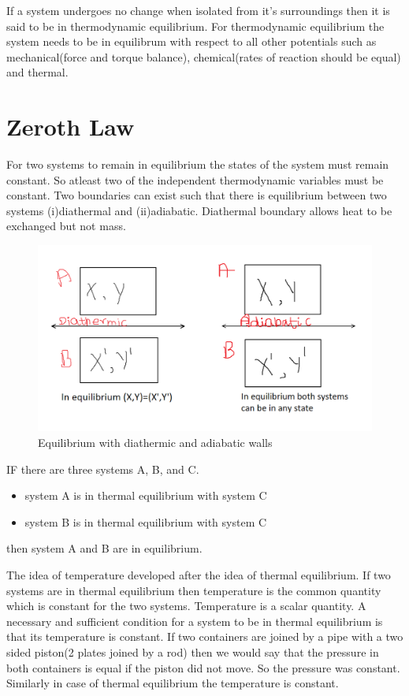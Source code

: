 \documentclass[12pt]{article}
\begin{document}
    If a system undergoes no change when isolated from it's surroundings then it is said to be in thermodynamic equilibrium. For thermodynamic equilibrium the system needs to be in equilibrum with respect to all other potentials such as mechanical(force and torque balance), chemical(rates of reaction should be equal) and thermal.
    \pagebreak
\section{Zeroth Law}
    For two systems to remain in equilibrium the states of the system must remain constant. So atleast two of the independent thermodynamic variables must be constant. Two boundaries can exist such that there is equilibrium between two systems (i)diathermal and (ii)adiabatic. Diathermal boundary allows heat to be exchanged but not mass. 
    
    \begin{figure}[h]
    	\includegraphics[scale=0.5]{zeroth_law.png}
    	\centering
    	\caption{Equilibrium with diathermic and adiabatic walls}
    \end{figure}
    \begin{tcolorbox}[title=Zeroth law]
    	IF there are three systems A, B, and C. 
    	\begin{itemize}
    		\item system A is in thermal equilibrium with system C
    		\item system B is in thermal equilibrium with system C
    	\end{itemize}
    then system A and B are in equilibrium.
    
    \end{tcolorbox}
   The idea of temperature developed after the idea of thermal equilibrium. If two systems are in thermal equilibrium then temperature is the common quantity which is constant for the two systems. Temperature is a scalar quantity. A necessary and sufficient condition for a system to be in thermal equilibrium is that its temperature is constant. If two containers are joined by a pipe with a two sided piston(2 plates joined by a rod) then we would say that the pressure in both containers is equal if the piston did not move. So the pressure was constant. Similarly in case of thermal equilibrium the temperature is constant. \\
   
\end{document}
